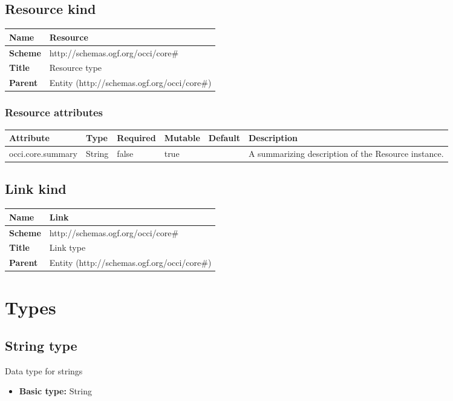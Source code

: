 \documentclass{article}
\begin{document}
\subsection{Resource kind}
\begin{center}
\begin{tabular}{|l|l|}
  \hline
  \textbf{Name} & Resource \\
  \hline  
  \textbf{Scheme} & http://schemas.ogf.org/occi/core\# \\
  \hline
  \textbf{Title} & Resource type \\
  \hline
  \textbf{Parent} & Entity (http://schemas.ogf.org/occi/core\#) \\
  \hline
\end{tabular}
\end{center}
\subsubsection{Resource attributes}
\begin{tabularx}{\textwidth}{|l|l|p{1.4cm}|p{1.3cm}|l|X|}
  \hline
  \textbf{Attribute} & \textbf{Type} & \textbf{Required} & \textbf{Mutable} & \textbf{Default} & \textbf{Description} \\
  \hline  
  occi.core.summary & String & false & true &  & A summarizing description of the Resource instance. \\
  \hline
\end{tabularx}


\subsection{Link kind}
\begin{center}
\begin{tabular}{|l|l|}
  \hline
  \textbf{Name} & Link \\
  \hline  
  \textbf{Scheme} & http://schemas.ogf.org/occi/core\# \\
  \hline
  \textbf{Title} & Link type \\
  \hline
  \textbf{Parent} & Entity (http://schemas.ogf.org/occi/core\#) \\
  \hline
\end{tabular}
\end{center}


\section{Types}
\subsection{String type}
Data type for strings
\begin{itemize}
\item \textbf{Basic type:} String
\end{itemize}
\end{document}
